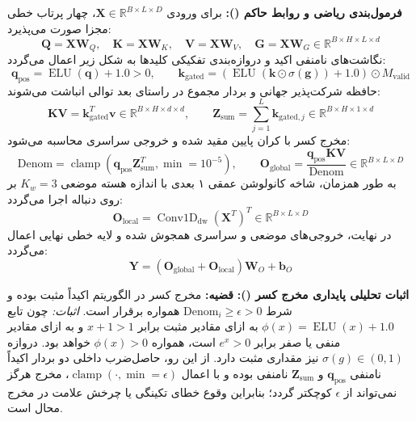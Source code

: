 \textbf{فرمول‌بندی ریاضی و روابط حاکم ():}
برای ورودی $\mathbf{X} \in \mathbb{R}^{B \times L \times D}$، چهار پرتاب خطی مجزا صورت می‌پذیرد:
\begin{equation}
\mathbf{Q} = \mathbf{X}\mathbf{W}_Q, \quad \mathbf{K} = \mathbf{X}\mathbf{W}_K, \quad \mathbf{V} = \mathbf{X}\mathbf{W}_V, \quad \mathbf{G} = \mathbf{X}\mathbf{W}_G \in \mathbb{R}^{B \times H \times L \times d}
\end{equation}
نگاشت‌های نامنفی اکید و دروازه‌بندی تفکیکی کلیدها به شکل زیر اعمال می‌گردد:
\begin{equation}
\mathbf{q}_{\text{pos}} = \operatorname{ELU}(\mathbf{q}) + 1.0 > 0, \qquad
\mathbf{k}_{\text{gated}} = (\operatorname{ELU}(\mathbf{k} \odot \sigma(\mathbf{g})) + 1.0) \odot M_{\text{valid}}
\end{equation}
حافظه شرکت‌پذیر جهانی و بردار مجموع در راستای بعد توالی انباشت می‌شوند:
\begin{equation}
\mathbf{KV} = \mathbf{k}_{\text{gated}}^T \mathbf{v} \in \mathbb{R}^{B \times H \times d \times d}, \qquad
\mathbf{Z}_{\text{sum}} = \sum_{j=1}^L \mathbf{k}_{\text{gated}, j} \in \mathbb{R}^{B \times H \times 1 \times d}
\end{equation}
مخرج کسر با کران پایین مقید شده و خروجی سراسری محاسبه می‌شود:
\begin{equation}
\text{Denom} = \operatorname{clamp}(\mathbf{q}_{\text{pos}} \mathbf{Z}_{\text{sum}}^T, \min=10^{-5}), \qquad
\mathbf{O}_{\text{global}} = \frac{\mathbf{q}_{\text{pos}} \mathbf{KV}}{\text{Denom}} \in \mathbb{R}^{B \times L \times D}
\end{equation}
به طور همزمان، شاخه کانولوشن عمقی ۱ بعدی با اندازه هسته موضعی $K_w = 3$ بر روی دنباله اجرا می‌گردد:
\begin{equation}
\mathbf{O}_{\text{local}} = \operatorname{Conv1D}_{\text{dw}}(\mathbf{X}^T)^T \in \mathbb{R}^{B \times L \times D}
\end{equation}
در نهایت، خروجی‌های موضعی و سراسری همجوش شده و لایه خطی نهایی اعمال می‌گردد:
\begin{equation}
\mathbf{Y} = (\mathbf{O}_{\text{global}} + \mathbf{O}_{\text{local}}) \mathbf{W}_O + \mathbf{b}_O
\end{equation}

\textbf{اثبات تحلیلی پایداری مخرج کسر ():}
\textbf{قضیه:} مخرج کسر در الگوریتم  اکیداً مثبت بوده و شرط $\text{Denom}_i \ge \epsilon > 0$ همواره برقرار است.
\textit{اثبات:} چون تابع $\phi(x) = \operatorname{ELU}(x) + 1.0$ به ازای مقادیر مثبت برابر $x+1 > 1$ و به ازای مقادیر منفی یا صفر برابر $e^x > 0$ است، همواره $\phi(x) > 0$ خواهد بود. دروازه $\sigma(g) \in (0, 1)$ نیز مقداری مثبت دارد. از این رو، حاصل‌ضرب داخلی دو بردار اکیداً نامنفی $\mathbf{q}_{\text{pos}}$ و $\mathbf{Z}_{\text{sum}}$ نامنفی بوده و با اعمال $\operatorname{clamp}(\cdot, \min=\epsilon)$، مخرج هرگز نمی‌تواند از $\epsilon$ کوچکتر گردد؛ بنابراین وقوع خطای تکینگی یا چرخش علامت در مخرج محال است.



